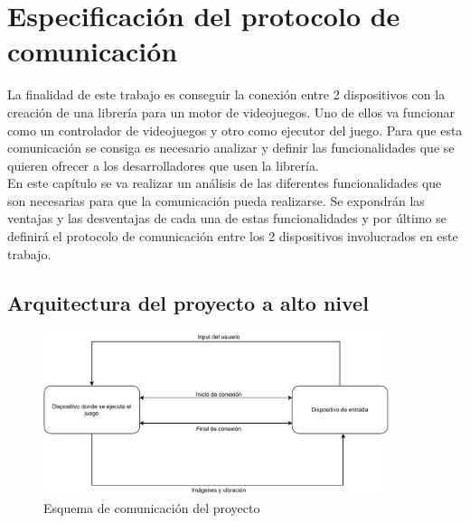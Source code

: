 


\begin{FraseCelebre}
\begin{Frase}
\end{Frase}
\begin{Fuente}
\end{Fuente}
\end{FraseCelebre}


\chapter{Especificaci\'on del protocolo de comunicaci\'on}
\label{cap3}
\label{cap:especificacion}


La finalidad de este trabajo es conseguir la conexi\'on entre 2 dispositivos con la creaci\'on de una librer\'ia para un motor de videojuegos. Uno de ellos va funcionar como un controlador de videojuegos y otro como ejecutor del juego. Para que esta comunicaci\'on se consiga es necesario analizar y definir las funcionalidades que se quieren ofrecer a los desarrolladores que usen la librer\'ia. \\

En este cap\'itulo se va realizar un an\'alisis de las diferentes funcionalidades que son necesarias para que la comunicaci\'on pueda realizarse. Se expondr\'an las ventajas y las desventajas de cada una de estas funcionalidades y por \'ultimo se definir\'a el protocolo de comunicaci\'on entre los 2 dispositivos involucrados en este trabajo.


\section{Arquitectura del proyecto a alto nivel}

\begin{figure}[!htb]
    \centering
    \includegraphics[width=0.90\textwidth]{./Imagenes/Vectorial/Diagrama protocolo.pdf}
    \caption{Esquema de comunicaci\'on del proyecto}
\label{Fig:arquitectura}
\end{figure}

